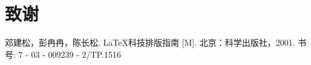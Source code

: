 \documentclass[]{theme}
\begin{document}
\newpage
\section*{致谢}



\newpage
\begin{thebibliography}{99}

 邓建松，彭冉冉，陈长松. \LaTeX 科技排版指南 [M]. 北京：科学出版社，2001. 书号: 7 - 03 - 009239 - 2/TP.1516



\end{thebibliography}




\end{document}
